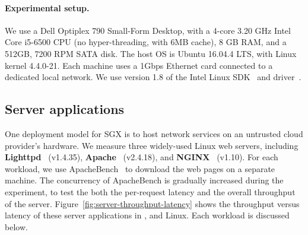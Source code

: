 
\paragraph{Experimental setup.}

We use a Dell Optiplex 790 Small-Form Desktop,
with a 4-core 3.20 GHz Intel Core i5-6500 CPU (no hyper-threading, with 6MB cache),
8 GB RAM, and a 512GB, 7200 RPM SATA disk.
The host OS is Ubuntu 16.04.4 LTS, with Linux kernel 4.4.0-21.
Each machine uses a 1Gbps Ethernet card connected to a dedicated local network.
We use version 1.8 of 
the Intel \sgx{} Linux SDK~\cite{intel-sgx-linux-sdk} and driver~\cite{intel-sgx-linux-driver}.


\subsection{Server applications}

One deployment model for SGX is to host network services
on an untrusted cloud provider's hardware.
We measure three widely-used Linux web servers, including {\bf Lighttpd}~\cite{lighttpd} (v1.4.35), {\bf Apache}~\cite{apache} (v2.4.18), and {\bf NGINX}~\cite{nginx} (v1.10).
For each workload, we use ApacheBench~\cite{apachebench} to download the web pages on a separate machine.
The concurrency of ApacheBench is gradually increased during the experiment, to test the both the per-request latency and the overall throughput of the server.
Figure~\ref{fig:server-throughput-latency} shows the throughput versus latency of these server applications
in \graphenesgx{}, \graphene{} and Linux. 
Each workload is discussed below.

